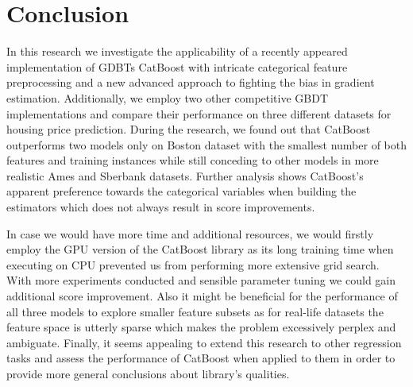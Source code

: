 \section{Conclusion}
\label{sec:conclusion}

In this research we investigate the applicability of a recently appeared implementation of GDBTs CatBoost with intricate categorical feature preprocessing and a new advanced approach to fighting the bias in gradient estimation. Additionally, we employ two other competitive GBDT implementations and compare their performance on three different datasets for housing price prediction. During the research, we found out that CatBoost outperforms two models only on Boston dataset with the smallest number of both features and training instances while still conceding to other models in more realistic Ames and Sberbank datasets. Further analysis shows CatBoost's apparent preference towards the categorical variables when building the estimators which does not always result in score improvements.

In case we would have more time and additional resources, we would firstly employ the GPU version of the CatBoost library as its long training time when executing on CPU prevented us from performing more extensive grid search. With more experiments conducted and sensible parameter tuning we could gain additional score improvement. Also it might be beneficial for the performance of all three models to explore smaller feature subsets as for real-life datasets the feature space is utterly sparse which makes the problem excessively perplex and ambiguate. Finally, it seems appealing to extend this research to other regression tasks and assess the performance of CatBoost when applied to them in order to provide more general conclusions about library's qualities.